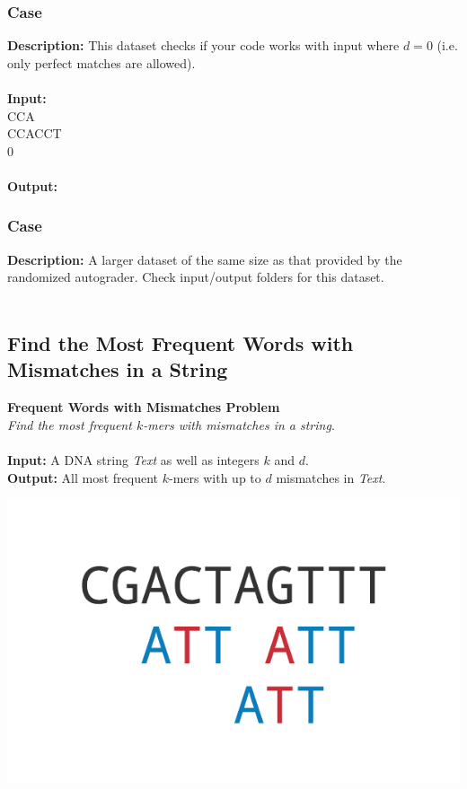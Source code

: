 \documentclass{article}
\newcommand{\code}[1]{{\fontfamily{pcr}\selectfont #1}}
\begin{document}
\subsubsection*{Case }
\hline \vspace{5}
\textbf{Description:} This dataset checks if your code works with input where $d=0$ (i.e. only perfect matches are allowed).\\ \\
\noindent \textbf{Input:}\\
\code{CCA\\CCACCT\\0}\\ \\
\noindent \textbf{Output:}\\
\code{0}

\subsubsection*{Case }
\hline \vspace{5}
\textbf{Description:} A larger dataset of the same size as that provided by the randomized autograder. Check input/output folders for this dataset.\\ \\
\pagebreak
\subsection{Find the Most Frequent Words with Mismatches in a String}
\hline\vspace{5}
\noindent \textbf{Frequent Words with Mismatches Problem}\\
\emph{Find the most frequent $k$-mers with mismatches in a string}.\\ \\
\textbf{Input:} A DNA string \emph{Text} as well as integers $k$ and $d$.\\
\textbf{Output:} All most frequent $k$-mers with up to $d$ mismatches in \emph{Text}.
\begin{center}
    \includegraphics[scale=0.2]{c1/logos/1I.png} 
\end{center}
\hline\vspace{5}
\end{document}
